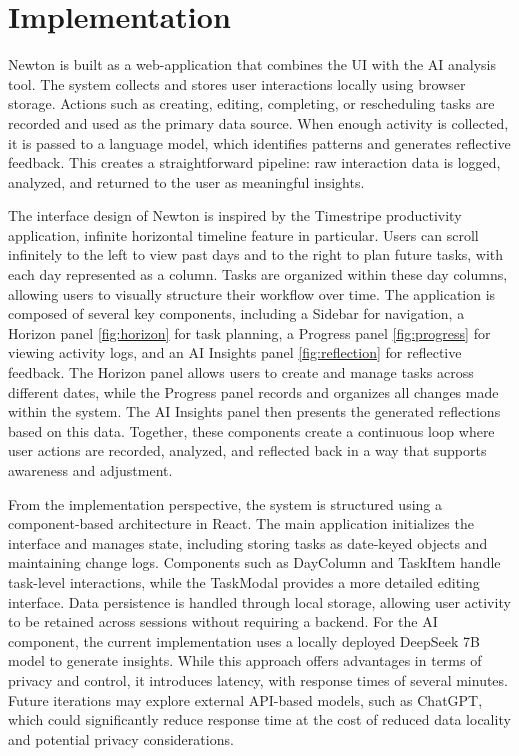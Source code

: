 \documentclass[12pt]{article}
\begin{document}
\section{Implementation}
Newton is built as a web-application that combines the UI with the AI analysis tool. The system collects and stores user 
interactions locally using browser storage. Actions such as creating, editing, completing, or rescheduling tasks are recorded and 
used as the primary data source. When enough activity is collected, it is passed to a language model, which identifies patterns and 
generates reflective feedback. This creates a straightforward pipeline: raw interaction data is logged, analyzed, and returned to 
the user as meaningful insights.


The interface design of Newton is inspired by 
the Timestripe productivity application, infinite horizontal timeline feature in particular. Users can scroll infinitely to the left 
to view past days and to the right to plan future tasks, with each day represented as a column. Tasks are organized within these day
 columns, allowing users to visually structure their workflow over time. The application is composed of several key components,
  including a Sidebar for navigation, a Horizon panel \ref{fig:horizon}  for task planning, a Progress panel \ref{fig:progress} for viewing activity logs, and an AI 
  Insights panel \ref{fig:reflection} for reflective feedback. The Horizon panel allows users to create and manage tasks across different dates, while
   the Progress panel records and organizes all changes made within the system. The AI Insights panel then presents the generated
    reflections based on this data. Together, these components create a continuous loop where user actions are recorded, analyzed,
     and reflected back in a way that supports awareness and adjustment.

From the implementation perspective, the system is structured using a component-based architecture in React. The main application 
initializes the interface and manages state, including storing tasks as date-keyed objects and maintaining change logs. Components 
such as DayColumn and TaskItem handle task-level interactions, while the TaskModal provides a more detailed editing interface. Data 
persistence is handled through local storage, allowing user activity to be retained across sessions without requiring a backend. For
 the AI component, the current implementation uses a locally deployed DeepSeek 7B model to generate insights. While this approach 
 offers advantages in terms of privacy and control, it introduces latency, with response times of several minutes. Future iterations
  may explore external API-based models, such as ChatGPT, which could significantly reduce response time at the cost of reduced data 
  locality and potential privacy considerations.
\end{document}
